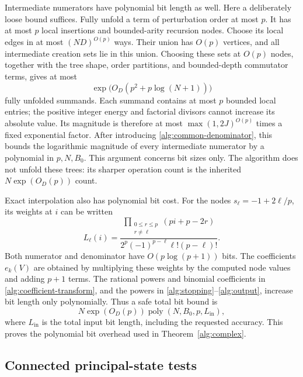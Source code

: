\documentclass[reqno]{amsart}
\theoremstyle{definition}
\theoremstyle{remark}
\begin{document}
Intermediate numerators have polynomial bit length as well.
Here a deliberately loose bound suffices.
Fully unfold a term of perturbation order at most \(p\).
It has at most \(p\) local insertions and bounded-arity recursion
nodes.  Choose its local edges in at most \((ND)^{O(p)}\)
ways.  Their union has \(O(p)\) vertices, and all intermediate
creation sets lie in this union.  Choosing these sets at
\(O(p)\) nodes, together with the tree shape, order partitions,
and bounded-depth commutator terms, gives at most
\[
 \exp\bigl(O_D(p^2+p\log(N+1))\bigr)
 \]
fully unfolded summands.  Each summand contains at most \(p\)
bounded local entries; the positive integer energy and factorial
divisors cannot increase its absolute value.
Its magnitude is therefore at most
\(\max(1,2J)^{O(p)}\) times a fixed exponential factor.
After introducing \eqref{alg:common-denominator}, this bounds
the logarithmic magnitude of every intermediate numerator by
a polynomial in \(p,N,B_0\).
This argument concerns bit sizes only.  The algorithm does not
unfold these trees: its sharper operation count is the inherited
\(N\exp(O_D(p))\) count.

Exact interpolation also has polynomial bit cost.
For the nodes \(s_\ell=-1+2\ell/p\), its weights at \(i\)
can be written
\begin{equation}
 L_\ell(i)=
 \frac{\displaystyle
       \prod_{\substack{0\le r\le p\\r\ne\ell}}
           (pi+p-2r)}
      {2^p(-1)^{p-\ell}\ell!(p-\ell)!}.
 \label{alg:interpolation-weights}
\end{equation}
Both numerator and denominator have
\(O(p\log(p+1))\) bits.
The coefficients \(e_k(V)\) are obtained by multiplying these
weights by the computed node values and adding \(p+1\) terms.
The rational powers and binomial coefficients in
\eqref{alg:coefficient-transform}, and the powers in
\eqref{alg:stopping}--\eqref{alg:output}, increase bit length
only polynomially.
Thus a safe total bit bound is
\[
 N\exp(O_D(p))\operatorname{poly}(N,B_0,p,L_{\mathrm{in}}),
 \]
where \(L_{\mathrm{in}}\) is the total input bit length,
including the requested accuracy.
This proves the polynomial bit overhead used in Theorem~\ref{alg:complex}.

\subsection{Connected principal-state tests}\label{alg:test-bit-details}
\end{document}
